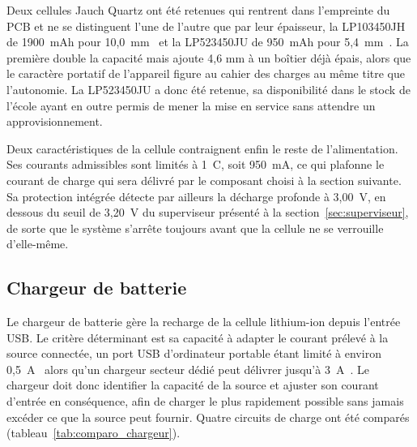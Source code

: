 Deux cellules Jauch Quartz ont été retenues qui rentrent dans l'empreinte du PCB et ne se distinguent l'une de l'autre que par leur épaisseur, la LP103450JH de 1900~mAh pour 10,0~mm~\cite{jauch_LP103450JH} et la LP523450JU de 950~mAh pour 5,4~mm~\cite{jauch_LP523450JU}. La première double la capacité mais ajoute 4,6 mm à un boîtier déjà épais, alors que le caractère portatif de l'appareil figure au cahier des charges au même titre que l'autonomie. La LP523450JU a donc été retenue, sa disponibilité dans le stock de l'école ayant en outre permis de mener la mise en service sans attendre un approvisionnement.

Deux caractéristiques de la cellule contraignent enfin le reste de l'alimentation. Ses courants admissibles sont limités à 1~C, soit 950~mA, ce qui plafonne le courant de charge qui sera délivré par le composant choisi à la section suivante. Sa protection intégrée détecte par ailleurs la décharge profonde à 3,00~V, en dessous du seuil de 3,20~V du superviseur présenté à la section~\ref{sec:superviseur}, de sorte que le système s'arrête toujours avant que la cellule ne se verrouille d'elle-même.






\subsection{Chargeur de batterie}

Le chargeur de batterie gère la recharge de la cellule lithium-ion depuis l'entrée USB. Le critère déterminant est sa capacité à adapter le courant prélevé à la source connectée, un port USB d'ordinateur portable étant limité à environ 0,5~A~\cite{usb_bc12} alors qu'un chargeur secteur dédié peut délivrer jusqu'à 3~A~\cite{usb_implementers_forum_inc_universal_2026}. Le chargeur doit donc identifier la capacité de la source et ajuster son courant d'entrée en conséquence, afin de charger le plus rapidement possible sans jamais excéder ce que la source peut fournir. Quatre circuits de charge ont été comparés (tableau~\ref{tab:comparo_chargeur}).

